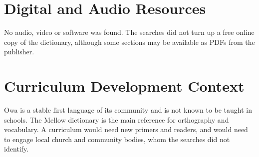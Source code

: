 \documentclass[12pt]{article}
\begin{document}
\section{Digital and Audio Resources}
No audio, video or software was found. The searches did not turn up a free online copy of the dictionary, although some sections may be available as PDFs from the publisher.

\section{Curriculum Development Context}
Owa is a stable first language of its community and is not known to be taught in schools. The Mellow dictionary is the main reference for orthography and vocabulary. A curriculum would need new primers and readers, and would need to engage local church and community bodies, whom the searches did not identify.
\end{document}
